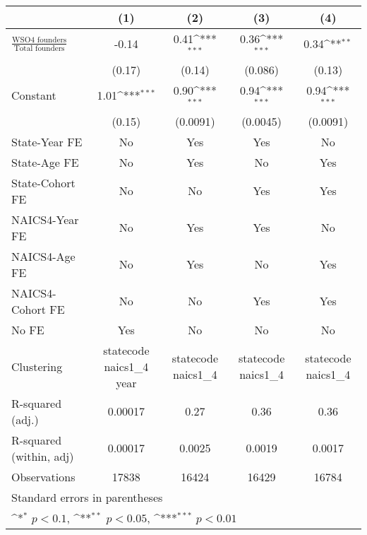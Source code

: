 {
\def\sym#1{\ifmmode^{#1}\else\(^{#1}\)\fi}
\begin{tabular}{l*{4}{c}}
\toprule
                    &\multicolumn{1}{c}{(1)}         &\multicolumn{1}{c}{(2)}         &\multicolumn{1}{c}{(3)}         &\multicolumn{1}{c}{(4)}         \\
\midrule
$\frac{\text{WSO4 founders}}{\text{Total founders}}$&       -0.14         &        0.41\sym{***}&        0.36\sym{***}&        0.34\sym{**} \\
                    &      (0.17)         &      (0.14)         &     (0.086)         &      (0.13)         \\
\addlinespace
Constant            &        1.01\sym{***}&        0.90\sym{***}&        0.94\sym{***}&        0.94\sym{***}\\
                    &      (0.15)         &    (0.0091)         &    (0.0045)         &    (0.0091)         \\
\addlinespace
State-Year FE       &          No         &         Yes         &         Yes         &          No         \\
\addlinespace
State-Age FE        &          No         &         Yes         &          No         &         Yes         \\
\addlinespace
State-Cohort FE     &          No         &          No         &         Yes         &         Yes         \\
\addlinespace
NAICS4-Year FE      &          No         &         Yes         &         Yes         &          No         \\
\addlinespace
NAICS4-Age FE       &          No         &         Yes         &          No         &         Yes         \\
\addlinespace
NAICS4-Cohort FE    &          No         &          No         &         Yes         &         Yes         \\
\addlinespace
No FE               &         Yes         &          No         &          No         &          No         \\
\midrule
Clustering          &statecode naics1\_4 year         &statecode naics1\_4         &statecode naics1\_4         &statecode naics1\_4         \\
R-squared (adj.)    &     0.00017         &        0.27         &        0.36         &        0.36         \\
R-squared (within, adj)&     0.00017         &      0.0025         &      0.0019         &      0.0017         \\
Observations        &       17838         &       16424         &       16429         &       16784         \\
\bottomrule
\multicolumn{5}{l}{\footnotesize Standard errors in parentheses}\\
\multicolumn{5}{l}{\footnotesize \sym{*} \(p<0.1\), \sym{**} \(p<0.05\), \sym{***} \(p<0.01\)}\\
\end{tabular}
}
